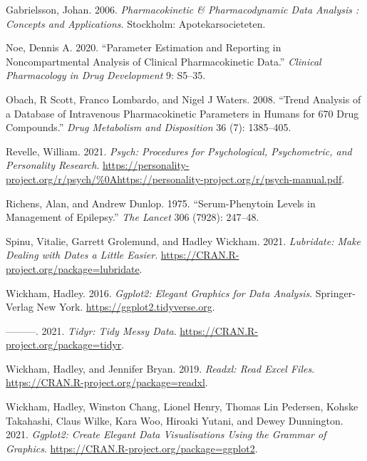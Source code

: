 \documentclass[
  11pt,
  krantz2, a4paper, twoside]{krantz}
\newlength{\cslhangindent}
\newlength{\cslentryspacingunit} %
\newenvironment{CSLReferences}[2] %
 {%
  \setlength{\parindent}{0pt}
  \ifodd #1
  \let\oldpar\par
  \def\par{\hangindent=\cslhangindent\oldpar}
  \fi
  \setlength{\parskip}{#2\cslentryspacingunit}
 }%
 {}
\theoremstyle{definition}
\theoremstyle{definition}
\theoremstyle{definition}
\theoremstyle{definition}
\theoremstyle{remark}
\begin{document}
\begin{CSLReferences}{1}{0}
\leavevmode{}%
Gabrielsson, Johan. 2006. \emph{Pharmacokinetic \& Pharmacodynamic Data Analysis : Concepts and Applications}. Stockholm: Apotekarsocieteten.

\leavevmode{}%
Noe, Dennis A. 2020. {``Parameter Estimation and Reporting in Noncompartmental Analysis of Clinical Pharmacokinetic Data.''} \emph{Clinical Pharmacology in Drug Development} 9: S5--35.

\leavevmode{}%
Obach, R Scott, Franco Lombardo, and Nigel J Waters. 2008. {``Trend Analysis of a Database of Intravenous Pharmacokinetic Parameters in Humans for 670 Drug Compounds.''} \emph{Drug Metabolism and Disposition} 36 (7): 1385--405.

\leavevmode{}%
Revelle, William. 2021. \emph{Psych: Procedures for Psychological, Psychometric, and Personality Research}. \url{https://personality-project.org/r/psych/\%0Ahttps://personality-project.org/r/psych-manual.pdf}.

\leavevmode{}%
Richens, Alan, and Andrew Dunlop. 1975. {``Serum-Phenytoin Levels in Management of Epilepsy.''} \emph{The Lancet} 306 (7928): 247--48.

\leavevmode{}%
Spinu, Vitalie, Garrett Grolemund, and Hadley Wickham. 2021. \emph{Lubridate: Make Dealing with Dates a Little Easier}. \url{https://CRAN.R-project.org/package=lubridate}.

\leavevmode{}%
Wickham, Hadley. 2016. \emph{Ggplot2: Elegant Graphics for Data Analysis}. Springer-Verlag New York. \url{https://ggplot2.tidyverse.org}.

\leavevmode{}%
---------. 2021. \emph{Tidyr: Tidy Messy Data}. \url{https://CRAN.R-project.org/package=tidyr}.

\leavevmode{}%
Wickham, Hadley, and Jennifer Bryan. 2019. \emph{Readxl: Read Excel Files}. \url{https://CRAN.R-project.org/package=readxl}.

\leavevmode{}%
Wickham, Hadley, Winston Chang, Lionel Henry, Thomas Lin Pedersen, Kohske Takahashi, Claus Wilke, Kara Woo, Hiroaki Yutani, and Dewey Dunnington. 2021. \emph{Ggplot2: Create Elegant Data Visualisations Using the Grammar of Graphics}. \url{https://CRAN.R-project.org/package=ggplot2}.


\end{CSLReferences}
\end{document}
